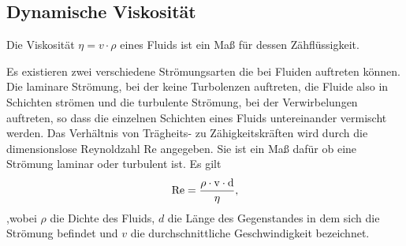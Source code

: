 \documentclass[12pt, a4paper, twoside]{scrartcl}
\begin{document}
\subsection{Dynamische Viskosität}
Die Viskosität $\eta=v\cdot\rho$ eines Fluids ist ein Maß für dessen Zähflüssigkeit.\linebreak

Es existieren zwei verschiedene Strömungsarten die bei Fluiden auftreten können. Die laminare Strömung, bei der keine Turbolenzen auftreten, die Fluide also in Schichten strömen und die turbulente Strömung, bei der Verwirbelungen auftreten, so dass die einzelnen Schichten eines Fluids untereinander vermischt werden.\newline
Das Verhältnis von Trägheits- zu Zähigkeitskräften wird durch die dimensionslose  Reynoldzahl Re angegeben. Sie ist ein Maß dafür ob eine Strömung laminar oder turbulent ist. Es gilt
\begin{align*}
  \rm{Re}=\frac{\rho\cdot v\cdot d}{\eta},
\end{align*}
,wobei $\rho$ die Dichte des Fluids, $d$ die Länge des Gegenstandes in dem sich die Strömung befindet und $v$ die durchschnittliche Geschwindigkeit bezeichnet.\linebreak
 
\end{document}
